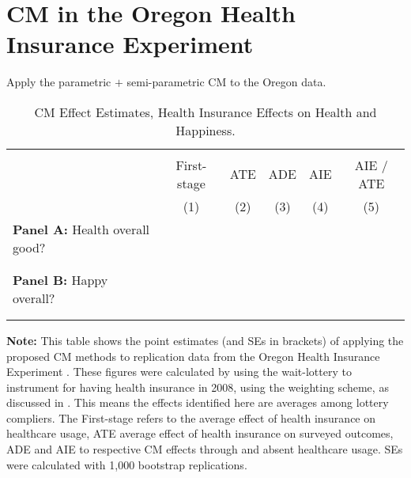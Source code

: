 \section{CM in the Oregon Health Insurance Experiment}
\label{sec:oregon}

Apply the parametric $+$ semi-parametric CM to the Oregon data.


\begin{table}[!htbp]
    \singlespacing
    \centering
    \small
    \caption{CM Effect Estimates, Health Insurance Effects on Health and Happiness.}
    \begin{tabular}{l c c c c c}
        \\[-1.8ex]\hline \hline \\[-1.8ex] 
        & First-stage & ATE & ADE & AIE & AIE / ATE \\
        \cmidrule(lr){2-6}
        & (1) & (2) & (3) & (4) & (5) \\
        \midrule
        \multicolumn{1}{l}{\textbf{Panel A:} Health overall good?} \\
        
        \\[-1.8ex]\hline \\[-1.8ex]
        \multicolumn{1}{l}{\textbf{Panel B:} Happy overall?} \\
        
        \\[-1.8ex]\hline \\[-1.8ex]
    \end{tabular}
    \vspace{-0.125cm}
    \label{tab:cm-oregon}
    \justify
    \footnotesize
    \textbf{Note:}
    This table shows the point estimates (and SEs in brackets) of applying the proposed CM methods to replication data from the Oregon Health Insurance Experiment \citep{icspr2014oregon}.
    These figures were calculated by using the wait-lottery to instrument for having health insurance in 2008, using the \cite{abadie2003semiparametric} weighting scheme, as discussed in .
    This means the effects identified here are averages among lottery compliers.
    The First-stage refers to the average effect of health insurance on healthcare usage, ATE average effect of health insurance on surveyed outcomes, ADE and AIE to respective CM effects through and absent healthcare usage.
    SEs were calculated with 1,000 bootstrap replications.
\end{table}



